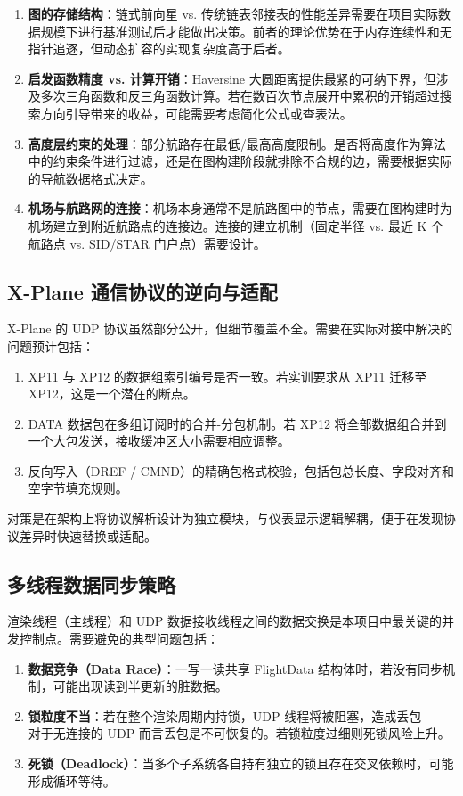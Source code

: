 \documentclass[12pt,a4paper]{ctexart}
\begin{document}
\begin{enumerate}[leftmargin=*]
    \item \textbf{图的存储结构}：链式前向星 vs. 传统链表邻接表的性能差异需要在项目实际数据规模下进行基准测试后才能做出决策。前者的理论优势在于内存连续性和无指针追逐，但动态扩容的实现复杂度高于后者。
    \item \textbf{启发函数精度 vs. 计算开销}：Haversine 大圆距离提供最紧的可纳下界，但涉及多次三角函数和反三角函数计算。若在数百次节点展开中累积的开销超过搜索方向引导带来的收益，可能需要考虑简化公式或查表法。
    \item \textbf{高度层约束的处理}：部分航路存在最低/最高高度限制。是否将高度作为算法中的约束条件进行过滤，还是在图构建阶段就排除不合规的边，需要根据实际的导航数据格式决定。
    \item \textbf{机场与航路网的连接}：机场本身通常不是航路图中的节点，需要在图构建时为机场建立到附近航路点的连接边。连接的建立机制（固定半径 vs. 最近 K 个航路点 vs. SID/STAR 门户点）需要设计。
\end{enumerate}

\subsection{X-Plane 通信协议的逆向与适配}

X-Plane 的 UDP 协议虽然部分公开，但细节覆盖不全。需要在实际对接中解决的问题预计包括：
\begin{enumerate}[leftmargin=*]
    \item XP11 与 XP12 的数据组索引编号是否一致。若实训要求从 XP11 迁移至 XP12，这是一个潜在的断点。
    \item DATA 数据包在多组订阅时的合并-分包机制。若 XP12 将全部数据组合并到一个大包发送，接收缓冲区大小需要相应调整。
    \item 反向写入（DREF / CMND）的精确包格式校验，包括包总长度、字段对齐和空字节填充规则。
\end{enumerate}

对策是在架构上将协议解析设计为独立模块，与仪表显示逻辑解耦，便于在发现协议差异时快速替换或适配。

\subsection{多线程数据同步策略}

渲染线程（主线程）和 UDP 数据接收线程之间的数据交换是本项目中最关键的并发控制点。需要避免的典型问题包括：

\begin{enumerate}[leftmargin=*]
    \item \textbf{数据竞争（Data Race）}：一写一读共享 FlightData 结构体时，若没有同步机制，可能出现读到半更新的脏数据。
    \item \textbf{锁粒度不当}：若在整个渲染周期内持锁，UDP 线程将被阻塞，造成丢包——对于无连接的 UDP 而言丢包是不可恢复的。若锁粒度过细则死锁风险上升。
    \item \textbf{死锁（Deadlock）}：当多个子系统各自持有独立的锁且存在交叉依赖时，可能形成循环等待。
\end{enumerate}
\end{document}

